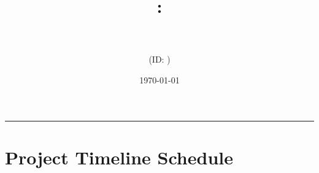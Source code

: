 \documentclass[12pt,a4paper]{article}
\title{\vspace{-1.5cm}\textbf{\large \modulecode: \moduletitle}\\[0.3cm]
	\Large \textbf{\projecttitle}\\[0.2cm]}
\author{\textbf{\studentname} \quad (ID: \studentid)}
\date{\today}
\begin{document}
	\maketitle
	\thispagestyle{empty}
	
	\noindent\rule{\textwidth}{0.8pt}
	\vspace{-0.3cm} 
	
	\section{Project Timeline Schedule}
	
	
\end{document}
